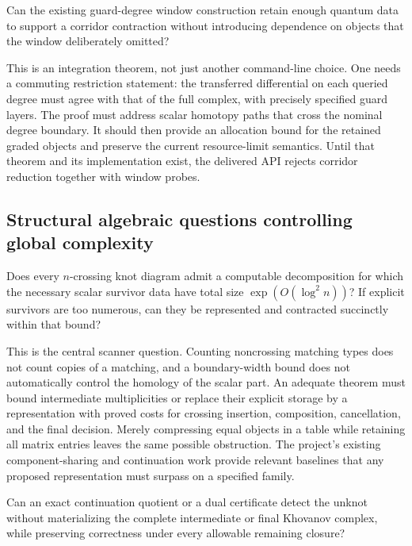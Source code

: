 \begin{researchquestion}
Can the existing guard-degree window construction retain enough quantum
data to support a corridor contraction without introducing dependence on
objects that the window deliberately omitted?
\end{researchquestion}

This is an integration theorem, not just another command-line choice.
One needs a commuting restriction statement: the transferred differential
on each queried degree must agree with that of the full complex, with
precisely specified guard layers. The proof must address scalar homotopy
paths that cross the nominal degree boundary. It should then provide an
allocation bound for the retained graded objects and preserve the current
resource-limit semantics. Until that theorem and its implementation exist,
the delivered API rejects corridor reduction together with window probes.

\subsection{Structural algebraic questions controlling global complexity}

\begin{researchquestion}
Does every $n$-crossing knot diagram admit a computable decomposition for
which the necessary scalar survivor data have total size
$\exp(O(\log^2 n))$? If explicit survivors are too numerous, can they be
represented and contracted succinctly within that bound?
\end{researchquestion}

This is the central scanner question. Counting noncrossing matching types
does not count copies of a matching, and a boundary-width bound does not
automatically control the homology of the scalar part. An adequate theorem
must bound intermediate multiplicities or replace their explicit storage
by a representation with proved costs for crossing insertion, composition,
cancellation, and the final decision. Merely compressing equal objects in
a table while retaining all matrix entries leaves the same possible
obstruction. The project's existing component-sharing and continuation
work provide relevant baselines that any proposed representation must
surpass on a specified family.

\begin{researchquestion}
Can an exact continuation quotient or a dual certificate detect the unknot
without materializing the complete intermediate or final Khovanov complex,
while preserving correctness under every allowable remaining closure?
\end{researchquestion}

